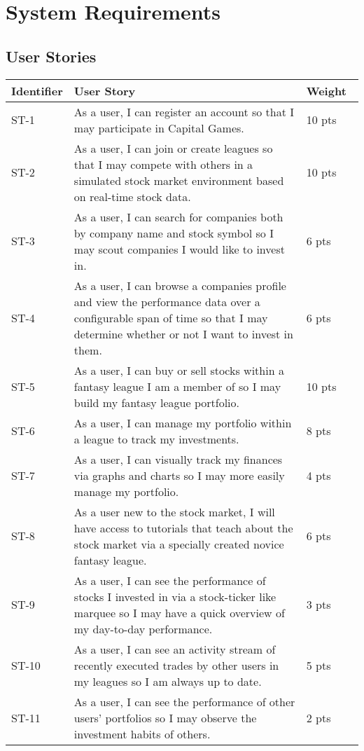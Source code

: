 \chapter{System Requirements}

\section{User Stories}

\begin{longtable}{|p{0.5in}|p{4.7in}|p{0.5in}|}
\hline
Identifier&User Story&Weight \\ \hline \hline
ST-1&As a user, I can register an account so that I may participate in Capital Games.&10 pts \\ \hline 
ST-2&As a user, I can join or create leagues so that I may compete with others in a simulated stock market environment based on real-time stock data.&10 pts \\ \hline 
ST-3&As a user, I can search for companies both by company name and stock symbol so I may scout companies I would like to invest in.&6 pts  \\ \hline 
ST-4&As a user, I can browse a companies profile and view the performance data over a configurable span of time so that I may determine whether or not I want to invest in them.&6 pts  \\ \hline 
ST-5&As a user, I can buy or sell stocks within a fantasy league I am a member of so I may build my fantasy league portfolio.&10 pts \\ \hline 
ST-6&As a user, I can manage my portfolio within a league to track my investments.&8 pts  \\ \hline 
ST-7&As a user, I can visually track my finances via graphs and charts so I may more easily manage my portfolio.&4 pts  \\ \hline 
ST-8&As a user new to the stock market, I will have access to tutorials that teach about the stock market via a specially created novice fantasy league.&6 pts  \\ \hline 
ST-9&As a user, I can see the performance of stocks I invested in via a stock-ticker like marquee so I may have a quick overview of my day-to-day performance.&3 pts  \\ \hline 
ST-10&As a user, I can see an activity stream of recently executed trades by other users in my leagues so I am always up to date.&5 pts  \\ \hline 
ST-11&As a user, I can see the performance of other users' portfolios so I may observe the investment habits of others.&2 pts  \\ \hline 

\end{longtable}
